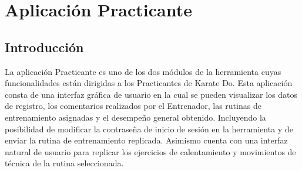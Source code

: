 \section{Aplicación Practicante}

\subsection{Introducción}
La aplicación Practicante es uno de los dos módulos de la herramienta cuyas funcionalidades están dirigidas a los Practicantes de Karate Do. Esta aplicación consta de una interfaz gráfica de usuario en la cual se pueden visualizar los datos de registro, los comentarios realizados por el Entrenador, las rutinas de entrenamiento asignadas y el desempeño general obtenido. Incluyendo la posibilidad  de modificar la contraseña de inicio de sesión en la herramienta y de enviar la rutina de entrenamiento replicada. Asimismo cuenta con una interfaz natural de usuario para replicar los ejercicios de calentamiento y movimientos de técnica de la rutina seleccionada.\\


